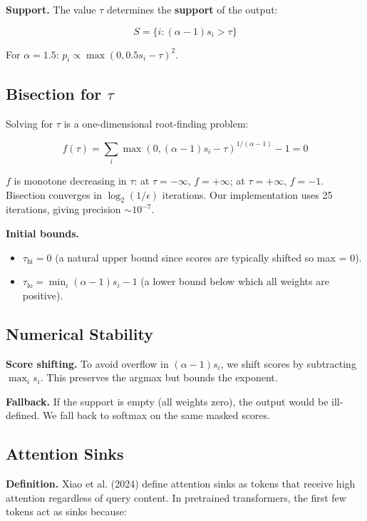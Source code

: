 \textbf{Support.} The value $\tau$ determines the \textbf{support} of the output:

\[
S = \{i : (\alpha - 1) s_i > \tau\}
\tag{3.6}
\]

For $\alpha = 1.5$: $p_i \propto \max(0, 0.5 s_i - \tau)^2$.

\subsection{Bisection for $\tau$}

Solving for $\tau$ is a one-dimensional root-finding problem:

\[
f(\tau) = \sum_i \max(0, (\alpha - 1) s_i - \tau)^{1/(\alpha - 1)} - 1 = 0
\tag{3.7}
\]

$f$ is monotone decreasing in $\tau$: at $\tau = -\infty$, $f = +\infty$; 
at $\tau = +\infty$, $f = -1$. Bisection converges in $\log_2(1/\epsilon)$ 
iterations. Our implementation uses 25 iterations, giving precision 
$\sim 10^{-7}$.

\textbf{Initial bounds.}

\begin{itemize}
\item $\tau_\text{hi} = 0$ (a natural upper bound since scores are typically
  shifted so max = 0).
\item $\tau_\text{lo} = \min_i (\alpha - 1) s_i - 1$ (a lower bound below which
  all weights are positive).

\end{itemize}
\subsection{Numerical Stability}

\textbf{Score shifting.} To avoid overflow in $(\alpha - 1) s_i$, we shift scores 
by subtracting $\max_i s_i$. This preserves the argmax but bounds the 
exponent.

\textbf{Fallback.} If the support is empty (all weights zero), the output would be 
ill-defined. We fall back to softmax on the same masked scores.

\subsection{Attention Sinks}

\textbf{Definition.} Xiao et al. (2024) define attention sinks as tokens that 
receive high attention regardless of query content. In pretrained transformers, 
the first few tokens act as sinks because:


